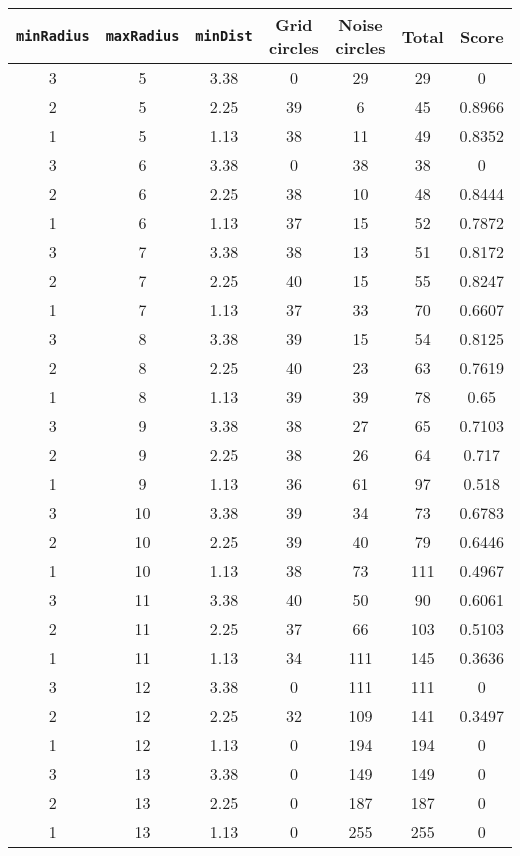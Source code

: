 \documentclass[letterpaper, 12pt]{article}
\begin{document}
\begin{longtable}{|c|c|c|c|c|c|c|}
\hline
\textbf{\texttt{minRadius}} & \textbf{\texttt{maxRadius}} & \textbf{\texttt{minDist}} & \textbf{Grid circles} & \textbf{Noise circles} & \textbf{Total} & \textbf{Score} \\
\hline
3 & 5 & 3.38 & 0 & 29 & 29 & 0 \\
\hline
2 & 5 & 2.25 & 39 & 6 & 45 & 0.8966 \\
\hline
1 & 5 & 1.13 & 38 & 11 & 49 & 0.8352 \\
\hline
3 & 6 & 3.38 & 0 & 38 & 38 & 0 \\
\hline
2 & 6 & 2.25 & 38 & 10 & 48 & 0.8444 \\
\hline
1 & 6 & 1.13 & 37 & 15 & 52 & 0.7872 \\
\hline
3 & 7 & 3.38 & 38 & 13 & 51 & 0.8172 \\
\hline
2 & 7 & 2.25 & 40 & 15 & 55 & 0.8247 \\
\hline
1 & 7 & 1.13 & 37 & 33 & 70 & 0.6607 \\
\hline
3 & 8 & 3.38 & 39 & 15 & 54 & 0.8125 \\
\hline
2 & 8 & 2.25 & 40 & 23 & 63 & 0.7619 \\
\hline
1 & 8 & 1.13 & 39 & 39 & 78 & 0.65 \\
\hline
3 & 9 & 3.38 & 38 & 27 & 65 & 0.7103 \\
\hline
2 & 9 & 2.25 & 38 & 26 & 64 & 0.717 \\
\hline
1 & 9 & 1.13 & 36 & 61 & 97 & 0.518 \\
\hline
3 & 10 & 3.38 & 39 & 34 & 73 & 0.6783 \\
\hline
2 & 10 & 2.25 & 39 & 40 & 79 & 0.6446 \\
\hline
1 & 10 & 1.13 & 38 & 73 & 111 & 0.4967 \\
\hline
3 & 11 & 3.38 & 40 & 50 & 90 & 0.6061 \\
\hline
2 & 11 & 2.25 & 37 & 66 & 103 & 0.5103 \\
\hline
1 & 11 & 1.13 & 34 & 111 & 145 & 0.3636 \\
\hline
3 & 12 & 3.38 & 0 & 111 & 111 & 0 \\
\hline
2 & 12 & 2.25 & 32 & 109 & 141 & 0.3497 \\
\hline
1 & 12 & 1.13 & 0 & 194 & 194 & 0 \\
\hline
3 & 13 & 3.38 & 0 & 149 & 149 & 0 \\
\hline
2 & 13 & 2.25 & 0 & 187 & 187 & 0 \\
\hline
1 & 13 & 1.13 & 0 & 255 & 255 & 0 \\

\end{longtable}
\end{document}
